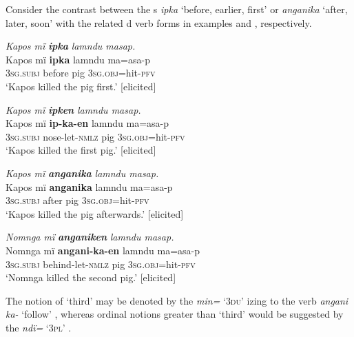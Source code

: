 Consider the contrast between the s \textit{ipka} ‘before, earlier, first’  or \textit{anganika} ‘after, later, soon’  with the related d verb forms in examples  and , respectively.

\ea%
    \label{ex:det:236}
          \textit{Kapos mï} \textbf{\textit{ipka}} \textit{lamndu masap.}\\
\gll    Kapos  mï      \textbf{ipka}  lamndu  ma=asa-p\\
    [name]  3\textsc{sg.subj}  before  pig      3\textsc{sg.obj}=hit-\textsc{pfv}\\
\glt `Kapos killed the pig first.’ [elicited]
\z

\ea%
    \label{ex:det:237}
          \textit{Kapos mï} \textbf{\textit{ipken}} \textit{lamndu masap.}\\
\gll    Kapos  mï      \textbf{ip-ka-en}    lamndu  ma=asa-p\\
    [name]  3\textsc{sg.subj}  nose{}-let{}-\textsc{nmlz}  pig      3\textsc{sg.obj}=hit-\textsc{pfv}\\
\glt `Kapos killed the first pig.’ [elicited]
\z


\ea%
    \label{ex:det:238}
          \textit{Kapos mï} \textbf{\textit{anganika}} \textit{lamndu masap.}\\
\gll    Kapos  mï      \textbf{anganika}  lamndu  ma=asa-p\\
    [name]  3\textsc{sg.subj}  after    pig      3\textsc{sg.obj}=hit-\textsc{pfv}\\
\glt `Kapos killed the pig afterwards.’ [elicited]
\z

\ea%
    \label{ex:det:239}
          \textit{Nomnga mï} \textbf{\textit{anganiken}} \textit{lamndu masap.}\\
\gll    Nomnga  mï      \textbf{angani-ka-en}    lamndu  ma=asa-p\\
    [name]    3\textsc{sg.subj}  behind-let-\textsc{nmlz}  pig      3\textsc{sg.obj}=hit-\textsc{pfv}\\
\glt `Nomnga killed the second pig.’ [elicited]
\z

The notion of ‘third’ may be denoted by the   \textit{min=} ‘\textsc{3du}’ izing to the verb \textit{angani ka-} ‘follow’ , whereas ordinal notions greater than ‘third’ would be suggested by the   \textit{ndï=} ‘\textsc{3pl}’ .

